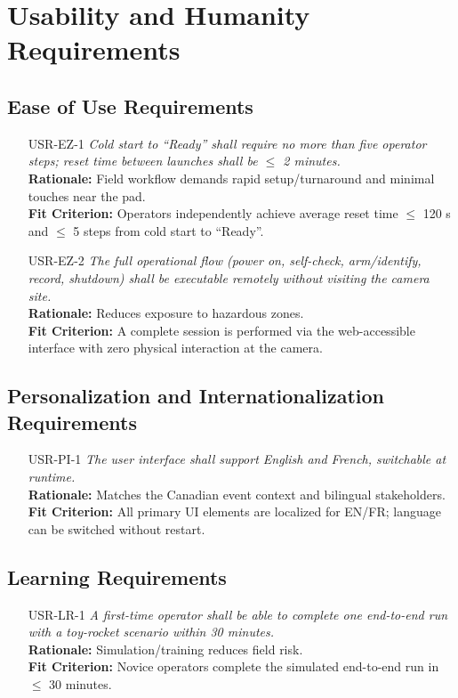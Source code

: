 \documentclass[12pt]{article}
\begin{document}
\section{Usability and Humanity Requirements}
\subsection{Ease of Use Requirements}
\begin{itemize}[leftmargin=*]
  \item[USR-EZ-1] \emph{Cold start to ``Ready'' shall require no more than five
          operator steps; reset time between launches shall be $\leq$ 2 minutes.}\\
        \textbf{Rationale:} Field workflow demands rapid setup/turnaround and minimal
        touches near the pad.\\ \textbf{Fit Criterion:} Operators independently achieve
        average reset time $\leq$ 120 s and $\leq$ 5 steps from cold start to
        ``Ready''.

  \item[USR-EZ-2] \emph{The full operational flow (power on, self-check, arm/identify,
          record, shutdown) shall be executable remotely without visiting the camera
          site.}\\ \textbf{Rationale:} Reduces exposure to hazardous zones.\\ \textbf{Fit
          Criterion:} A complete session is performed via the web-accessible interface
        with zero physical interaction at the camera.
\end{itemize}

\subsection{Personalization and Internationalization Requirements}
\begin{itemize}[leftmargin=*]
  \item[USR-PI-1] \emph{The user interface shall support English and French, switchable
          at runtime.}\\ \textbf{Rationale:} Matches the Canadian event context and
        bilingual stakeholders.\\ \textbf{Fit Criterion:} All primary UI elements are
        localized for EN/FR; language can be switched without restart.
\end{itemize}

\subsection{Learning Requirements}
\begin{itemize}[leftmargin=*]
  \item[USR-LR-1] \emph{A first-time operator shall be able to complete one end-to-end
          run with a toy-rocket scenario within 30 minutes.}\\ \textbf{Rationale:}
        Simulation/training reduces field risk.\\ \textbf{Fit Criterion:} Novice
        operators complete the simulated end-to-end run in $\leq$ 30 minutes.
\end{itemize}
\end{document}
